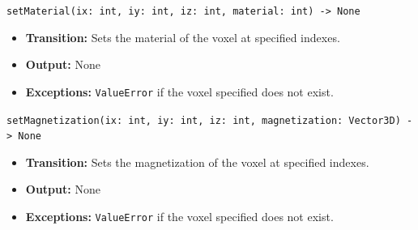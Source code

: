 \documentclass[12pt, titlepage]{article}
\begin{document}
\texttt{setMaterial(ix: int, iy: int, iz: int, material: int) -> None}
\begin{itemize}
  \item \textbf{Transition:} Sets the material of the voxel at specified indexes.
  \item \textbf{Output:} None 
  \item \textbf{Exceptions:} \texttt{ValueError} if the voxel specified does not exist.
\end{itemize}
\texttt{setMagnetization(ix: int, iy: int, iz: int, magnetization: Vector3D) -> None}
\begin{itemize}
  \item \textbf{Transition:} Sets the magnetization of the voxel at specified indexes.
  \item \textbf{Output:} None
  \item \textbf{Exceptions:} \texttt{ValueError} if the voxel specified does not exist.
\end{itemize}

\end{document}
